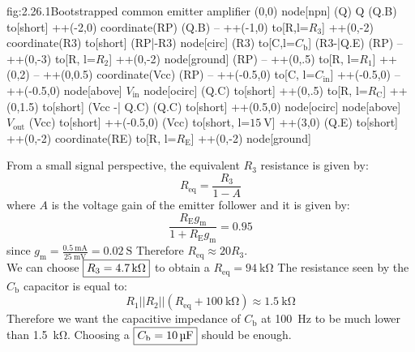 \begin{circuit}{fig:2.26.1}{Bootstrapped common emitter amplifier}
    (0,0) node[npn] (Q) {Q}
    (Q.B) to[short] ++(-2,0) coordinate(RP)
    (Q.B) -- ++(-1,0)
    to[R,l=$R_3$] ++(0,-2) coordinate(R3)
    to[short] (RP|-R3)
    node[circ] {}
    (R3) to[C,l=$C_\text{b}$] (R3-|Q.E)
    (RP) -- ++(0,-3)
    to[R, l=$R_2$] ++(0,-2)
    node[ground] {}
    (RP) -- ++(0,.5)
    to[R, l=$R_1$] ++(0,2)
    -- ++(0,0.5) coordinate(Vcc)
    (RP) -- ++(-0.5,0)
    to[C, l=$C_\text{in}$] ++(-0.5,0)
    -- ++(-0.5,0)
    node[above] {$V_\text{in}$}
    node[ocirc] {}
    (Q.C) to[short] ++(0,.5)
    to[R, l=$R_\text{C}$] ++(0,1.5)
    to[short] (Vcc -| Q.C)
    (Q.C) to[short] ++(0.5,0)
    node[ocirc] {}
    node[above] {$V_\text{out}$}
    (Vcc) to[short] ++(-0.5,0)
    (Vcc) to[short, l=$\SI{15}{\volt}$] ++(3,0)
    (Q.E) to[short] ++(0,-2) coordinate(RE)
    to[R, l=$R_\text{E}$] ++(0,-2)
    node[ground] {}
\end{circuit}

From a small signal perspective, the equivalent $R_3$ resistance is given by:
\[R_\text{eq}=\frac{R_3}{1-A}\]
where $A$ is the voltage gain of the emitter follower and it is given by:
\[\frac{R_\text{E}g_\text{m}}{1+R_\text{E}g_\text{m}}=0.95\]
since $g_\text{m}=\frac{\SI{0.5}{\milli\ampere}}{\SI{25}{\milli\volt}}=\SI{0.02}{\siemens}$
Therefore $R_\text{eq}\approx 20R_3$.\\
We can choose $\boxed{R_3=\SI{4.7}{\kilo\ohm}}$ to obtain a $R_\text{eq}=\SI{94}{\kilo\ohm}$
The resistance seen by the $C_\text{b}$ capacitor is equal to:
\[R_1||R_2||(R_\text{eq}+\SI{100}{\kilo\ohm})\approx \SI{1.5}{\kilo\ohm}\]
Therefore we want the capacitive impedance of $C_\text{b}$ at \SI{100}{\hertz} to be much lower than \SI{1.5}{\kilo\ohm}.
Choosing a $\boxed{C_\text{b}=\SI{10}{\micro\farad}}$ should be enough.

